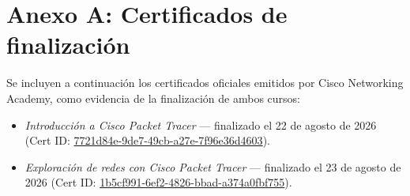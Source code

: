 \documentclass[11pt,a4paper]{article}
\begin{document}
\appendix
\section{Anexo A: Certificados de finalización}

Se incluyen a continuación los certificados oficiales emitidos por Cisco
Networking Academy, como evidencia de la finalización de ambos cursos:

\begin{itemize}
  \item \textit{Introducción a Cisco Packet Tracer} --- finalizado el 22 de
        agosto de 2026 (Cert ID: \url{7721d84e-9de7-49cb-a27e-7f96e36d4603}).
  \item \textit{Exploración de redes con Cisco Packet Tracer} --- finalizado
        el 23 de agosto de 2026
        (Cert ID: \url{1b5cf991-6ef2-4826-bbad-a374a0fbf755}).
\end{itemize}



\end{document}
